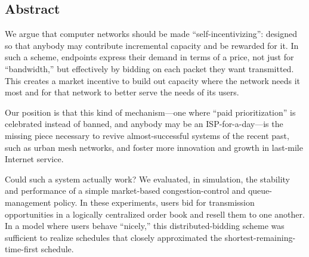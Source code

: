 \subsection*{Abstract}
We argue that computer networks should be made ``self-incentivizing'':
designed so that anybody may contribute incremental capacity and be
rewarded for it. In such a scheme, endpoints express their demand in
terms of a price, not just for ``bandwidth,'' but effectively by
bidding on each packet they want transmitted. This creates a market
incentive to build out capacity where the network needs it most and 
for that network to better serve the needs of its users.

Our position is that this kind of mechanism---one where ``paid
prioritization'' is celebrated instead of banned, and anybody may be an
ISP-for-a-day---is the missing piece necessary to revive
almost-successful systems of the recent past, such as urban mesh
networks, and foster more innovation and growth in last-mile Internet service.

Could such a system actually work? We evaluated, in simulation, the
stability and performance of a simple market-based congestion-control and queue-management
policy. In these experiments, users bid for
transmission opportunities in a logically centralized order book and
resell them to one another. In a model where users behave ``nicely,''
this distributed-bidding scheme was sufficient to realize schedules
that closely approximated the shortest-remaining-time-first
schedule.
